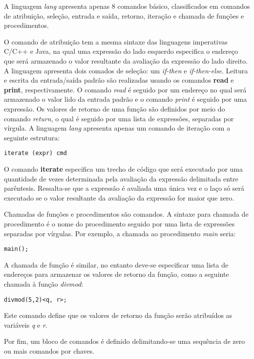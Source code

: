 \documentclass[a4paper,11pt]{article}
\begin{document}
A linguagem \emph{lang} apresenta apenas 8 comandos básico, classificados em comandos de atribuição,
seleção, entrada e saída, retorno, iteração e chamada de funções e procedimentos.

O comando de atribuição tem a mesma sintaxe das linguagens imperativas C/C++ e Java, na qual uma
expressão do lado esquerdo especifica o endereço que será armazenado o valor resultante da avaliação
da expressão do lado direito. A linguagem apresenta dois comados de seleção: um \emph{if-then} e \emph{if-then-else}.
Leitura e escrita da entrada/saída padrão são realizadas usando os comandos \textbf{read} e \textbf{print},
respectivamente. O comando \emph{read} é seguido por um endereço no qual será armazenado o valor lido da
entrada padrão e o comando \emph{print} é seguido por uma expressão. Os valores de retorno de uma função são
definidos por meio do comando \emph{return}, o qual é seguido por uma lista de expressões, separadas por vírgula.
A linguagem \emph{lang} apresenta apenas um comando de iteração com a seguinte estrutura:

\begin{verbatim}
iterate (expr) cmd
\end{verbatim}

O comando \textbf{iterate} especifica um trecho de código que será executado por uma quantidade de vezes determinada
pela avaliação da expressão delimitada entre parêntesis. Ressalta-se que a expressão é avaliada uma única vez e
o laço só será executado se o valor resultante da avaliação da expressão for maior que zero.

Chamadas de funções e procedimentos são comandos.
A sintaxe para chamada de procedimento é o nome do procedimento seguido por uma lista de expressões separadas
por vírgulas. Por exemplo, a chamada ao procedimento \emph{main} seria:

\begin{verbatim}
main();
\end{verbatim}

A chamada de função é similar, no entanto deve-se especificar uma lista de endereços para armazenar os valores de
retorno da função, como a seguinte chamada à função \emph{divmod}:
\begin{verbatim}
divmod(5,2)<q, r>;
\end{verbatim}

Este comando define que os valores de retorno da função serão atribuídos as variáveis \emph{q} e \emph{r}.

Por fim, um bloco de comandos é definido delimitando-se uma sequência de zero ou mais comandos por chaves.
\end{document}
